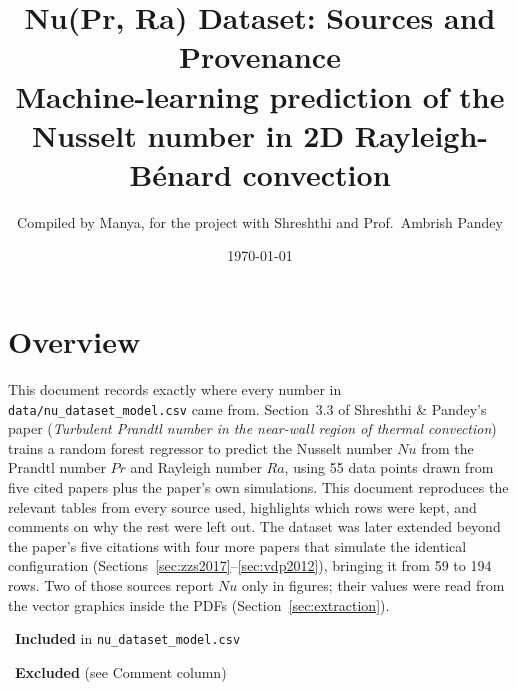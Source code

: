 \documentclass[11pt]{article}
\title{\textbf{Nu(Pr, Ra) Dataset: Sources and Provenance}\\[0.3em]
\large Machine-learning prediction of the Nusselt number in 2D Rayleigh-B\'enard convection}
\author{Compiled by Manya, for the project with Shreshthi and Prof.\ Ambrish Pandey}
\date{\today}
\newcommand{\legend}{%
  \noindent
  \colorbox{included}{\rule{0pt}{1.6ex}\hspace{1.6ex}} \ \textbf{Included} in \texttt{nu\_dataset\_model.csv} \qquad
  \colorbox{excluded}{\rule{0pt}{1.6ex}\hspace{1.6ex}} \ \textbf{Excluded} (see Comment column)
  \vspace{0.5em}
}
\begin{document}
\sloppy
\maketitle

\section*{Overview}
This document records exactly where every number in
\texttt{data/nu\_dataset\_model.csv} came from. Section~3.3 of Shreshthi \&
Pandey's paper (\emph{Turbulent Prandtl number in the near-wall region of
thermal convection}) trains a random forest regressor to predict the Nusselt
number $Nu$ from the Prandtl number $Pr$ and Rayleigh number $Ra$, using 55
data points drawn from five cited papers plus the paper's own simulations.
This document reproduces the relevant tables from every source used,
highlights which rows were kept, and comments on why the rest were left
out. The dataset was later extended beyond the paper's five citations with
four more papers that simulate the identical configuration
(Sections~\ref{sec:zzs2017}--\ref{sec:vdp2012}), bringing it from 59 to
194 rows. Two of those sources report $Nu$ only in figures; their values
were read from the vector graphics inside the PDFs
(Section~\ref{sec:extraction}).

\legend
\end{document}
